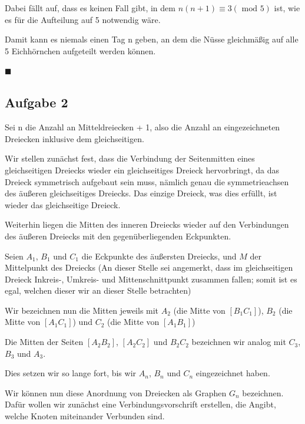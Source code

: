 \documentclass[11pt]{article}
\begin{document}
    Dabei fällt auf, dass es keinen Fall gibt, in dem $n(n+1) \equiv 3 (\text{ mod } 5)$ ist, wie es für die
    Aufteilung auf 5 notwendig wäre.

    Damit kann es niemals einen Tag n geben, an dem die Nüsse gleichmäßig auf alle 5 Eichhörnchen aufgeteilt werden
    können.

    $\blacksquare$

    \newpage

    \subsection*{Aufgabe 2}

    Sei n die Anzahl an Mitteldreiecken + 1, also die Anzahl an eingezeichneten Dreiecken inklusive dem gleichseitigen.

    \bigskip

    Wir stellen zunächst fest, dass die Verbindung der Seitenmitten eines gleichseitigen Dreiecks
    wieder ein gleichseitiges Dreieck hervorbringt,
    da das Dreieck symmetrisch aufgebaut sein muss, nämlich genau die symmetrieachsen des äußeren gleichseitiges
    Dreiecks.
    Das einzige Dreieck, was dies erfüllt, ist wieder das gleichseitige Dreieck.

    Weiterhin liegen die Mitten des inneren Dreiecks wieder auf den Verbindungen des äußeren Dreiecks
    mit den gegenüberliegenden Eckpunkten.

    \bigskip

    Seien $A_1$, $B_1$ und $C_1$ die Eckpunkte des äußersten Dreiecks, und $M$ der Mittelpunkt des Dreiecks
    (An dieser Stelle sei angemerkt, dass im gleichseitigen Dreieck Inkreis-, Umkreis- und Mittenschnittpunkt
    zusammen fallen;
    somit ist es egal, welchen dieser wir an dieser Stelle betrachten)

    Wir bezeichnen nun die Mitten jeweils mit $A_2$ (die Mitte von $[B_1C_1]$), $B_2$ (die Mitte von $[A_1C_1]$)
    und $C_2$ (die Mitte von $[A_1B_1]$)

    Die Mitten der Seiten $[A_2B_2]$, $[A_2C_2]$ und $B_2C_2$ bezeichnen wir analog mit $C_3$, $B_3$ und $A_3$.

    Dies setzen wir so lange fort, bis wir $A_n$, $B_n$ und $C_n$ eingezeichnet haben.

    \bigskip

    Wir können nun diese Anordnung von Dreiecken als Graphen $G_n$ bezeichnen.
    Dafür wollen wir zunächst eine Verbindungsvorschrift erstellen, die Angibt, welche Knoten
    miteinander Verbunden sind.
\end{document}
